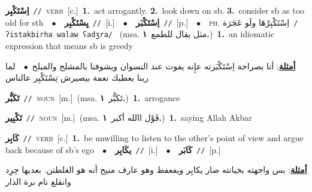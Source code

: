 \documentclass[10pt,a4paper,twoside]{article} %
\begin{document}
\begin{multicols}{2}
{{{{{{{{{{{\setlength\topsep{0pt}\textbf{\foreignlanguage{arabic}{اِسْتَكْبِر}}\ {\color{gray}\texttt{//}\color{black}}\ \textsc{verb}\ [c.]\ \textbf{1.}~act arrogantly.  \textbf{2.}~look down on sb.  \textbf{3.}~consider sb as too old for sth\ \ $\bullet$\ \ \setlength\topsep{0pt}\textbf{\foreignlanguage{arabic}{يِسْتَكْبِر}}\ {\color{gray}\texttt{//}\color{black}}\ [i.]\ \ $\bullet$\ \ \setlength\topsep{0pt}\textbf{\foreignlanguage{arabic}{اِسْتَكْبَر}}\ {\color{gray}\texttt{//}\color{black}}\ [p.]\ \ $\bullet$\ \ \textsc{ph.} \color{gray} \foreignlanguage{arabic}{اِسْتَكْبِرْهَا ولَو عَجَرَة}\color{black}\ {\color{gray}\texttt{/{\sffamily ʔistakbirha walaw ʕadʒra}/}\color{black}}\ \color{gray} (msa. \foreignlanguage{arabic}{مثل يقال للطمع}~\foreignlanguage{arabic}{\textbf{١.}})\color{black}\ \textbf{1.}~an idiomatic expression that means sb is greedy\  \begin{flushright}\color{gray}\foreignlanguage{arabic}{\textbf{\underline{\foreignlanguage{arabic}{أمثلة}}}: أنا بصراحة اِسْتَكْبَرته عإِنه يفوت عند النسوان ويشوفنا بالمشلح والمبلح\ $\bullet$\ \  لما ربنا يعطيك نعمة بيصيرش تِسْتَكْبِر عالناس}\end{flushright}\color{black}} \vspace{2mm}

{\setlength\topsep{0pt}\textbf{\foreignlanguage{arabic}{تَكَبُّر}}\ {\color{gray}\texttt{//}\color{black}}\ \textsc{noun}\ [m.]\ \color{gray}(msa. \foreignlanguage{arabic}{تَكَبُّر}~\foreignlanguage{arabic}{\textbf{١.}})\color{black}\ \textbf{1.}~arrogance\ 

{\setlength\topsep{0pt}\textbf{\foreignlanguage{arabic}{تَكْبِير}}\ {\color{gray}\texttt{//}\color{black}}\ \textsc{noun}\ [m.]\ \color{gray}(msa. \foreignlanguage{arabic}{قَوْل االله أكبر}~\foreignlanguage{arabic}{\textbf{١.}})\color{black}\ \textbf{1.}~saying Allah Akbar\ 

{\setlength\topsep{0pt}\textbf{\foreignlanguage{arabic}{كَابِر}}\ {\color{gray}\texttt{//}\color{black}}\ \textsc{verb}\ [c.]\ \textbf{1.}~be unwilling to listen to the other's point of view and argue back because of sb's ego\ \ $\bullet$\ \ \setlength\topsep{0pt}\textbf{\foreignlanguage{arabic}{يكَابِر}}\ {\color{gray}\texttt{//}\color{black}}\ [i.]\ \ $\bullet$\ \ \setlength\topsep{0pt}\textbf{\foreignlanguage{arabic}{كَابَر}}\ {\color{gray}\texttt{//}\color{black}}\ [p.]\  \begin{flushright}\color{gray}\foreignlanguage{arabic}{\textbf{\underline{\foreignlanguage{arabic}{أمثلة}}}: بس واجهته بخيانته صار يكابِر ويفعفط وهو عارف منيح أنه هو الغلطتن. بعديها حِرِد وانقلع نام برة الدار}\end{flushright}\color{black}} \vspace{2mm}

}}}}}}}}}}}}
\end{multicols}
\end{document}
